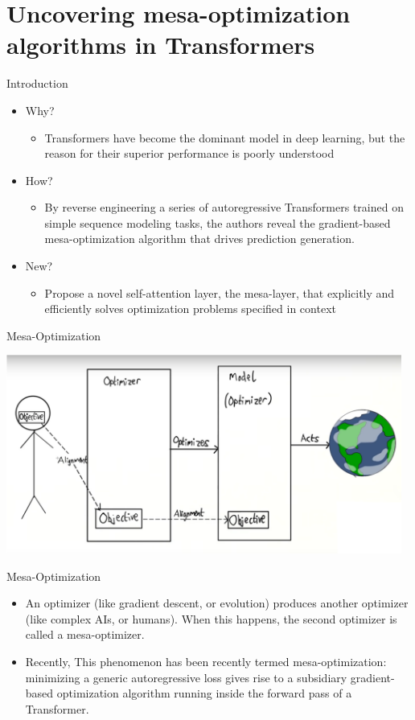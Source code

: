 \documentclass[aspectratio=1610,xcolor={dvipsnames},hyperref={colorlinks,unicode,linkcolor=violet,anchorcolor=BlueViolet,citecolor=YellowOrange,filecolor=black,urlcolor=Aquamarine}]{beamer}
\begin{document}
\section{Uncovering mesa-optimization algorithms in Transformers}
\label{sec:orgf77d803}

\begin{frame}[label={sec:org446fb73}]{Introduction}
\begin{itemize}
\item Why?
\begin{itemize}
\item Transformers have become the dominant model in deep learning, but the reason for their superior performance is poorly understood
\end{itemize}
\item How?
\begin{itemize}
\item By reverse engineering a series of autoregressive Transformers trained on simple sequence modeling tasks, the authors reveal the gradient-based mesa-optimization algorithm that drives prediction generation.
\end{itemize}
\item New?
\begin{itemize}
\item Propose a novel self-attention layer, the mesa-layer, that explicitly and efficiently solves optimization problems specified in context
\end{itemize}
\end{itemize}
\end{frame}
\begin{frame}[label={sec:org015f920}]{Mesa-Optimization}
\begin{center}
\includegraphics[width=13cm]{./p9.png}
\end{center}
\end{frame}
\begin{frame}[label={sec:org233d215}]{Mesa-Optimization}
\begin{itemize}
\item An optimizer (like gradient descent, or evolution) produces another optimizer (like complex AIs, or humans). When this happens, the second optimizer is called a mesa-optimizer.

\item Recently, This phenomenon has been recently termed mesa-optimization: minimizing a generic autoregressive loss gives rise to a subsidiary gradient-based optimization algorithm running inside the forward pass of a Transformer.
\end{itemize}
\end{frame}
\end{document}
